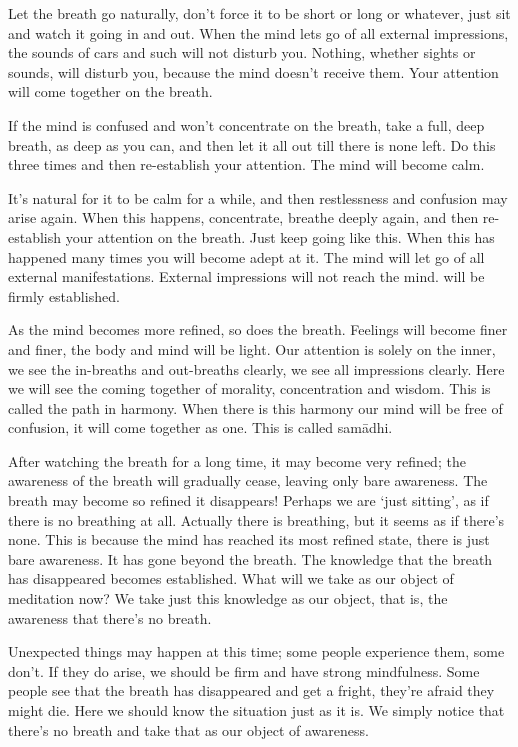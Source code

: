 Let the breath go naturally, don't force it to be short or long or whatever, just sit and watch it going in and out. When the mind lets go of all external impressions, the sounds of cars and such will not disturb you. Nothing, whether sights or sounds, will disturb you, because the mind doesn't receive them. Your attention will come together on the breath.

If the mind is confused and won't concentrate on the breath, take a full, deep breath, as deep as you can, and then let it all out till there is none left. Do this three times and then re-establish your attention. The mind will become calm.

It's natural for it to be calm for a while, and then restlessness and confusion may arise again. When this happens, concentrate, breathe deeply again, and then re-establish your attention on the breath. Just keep going like this. When this has happened many times you will become adept at it. The mind will let go of all external manifestations. External impressions will not reach the mind.  will be firmly established.

As the mind becomes more refined, so does the breath. Feelings will become finer and finer, the body and mind will be light. Our attention is solely on the inner, we see the in-breaths and out-breaths clearly, we see all impressions clearly. Here we will see the coming together of morality, concentration and wisdom. This is called the path in harmony. When there is this harmony our mind will be free of confusion, it will come together as one. This is called sam\=adhi.

After watching the breath for a long time, it may become very refined; the awareness of the breath will gradually cease, leaving only bare awareness. The breath may become so refined it disappears! Perhaps we are `just sitting', as if there is no breathing at all. Actually there is breathing, but it seems as if there's none. This is because the mind has reached its most refined state, there is just bare awareness. It has gone beyond the breath. The knowledge that the breath has disappeared becomes established. What will we take as our object of meditation now? We take just this knowledge as our object, that is, the awareness that there's no breath.

Unexpected things may happen at this time; some people experience them, some don't. If they do arise, we should be firm and have strong mindfulness. Some people see that the breath has disappeared and get a fright, they're afraid they might die. Here we should know the situation just as it is. We simply notice that there's no breath and take that as our object of awareness.

